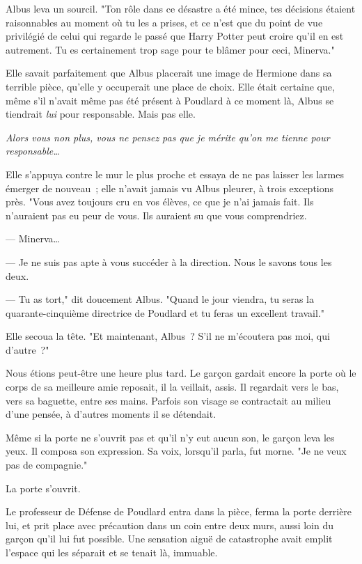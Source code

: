 Albus leva un sourcil. "Ton rôle dans ce désastre a été mince, tes décisions étaient raisonnables au moment où tu les a prises, et ce n'est que du point de vue privilégié de celui qui regarde le passé que Harry Potter peut croire qu'il en est autrement. Tu es certainement trop sage pour te blâmer pour ceci, Minerva."

Elle savait parfaitement que Albus placerait une image de Hermione dans sa terrible pièce, qu'elle y occuperait une place de choix. Elle était certaine que, même s'il n'avait même pas été présent à Poudlard à ce moment là, Albus se tiendrait \emph{lui} pour responsable. Mais pas elle.

\emph{Alors vous non plus, vous ne pensez pas que je mérite qu'on me tienne pour responsable…}

Elle s'appuya contre le mur le plus proche et essaya de ne pas laisser les larmes émerger de nouveau~; elle n'avait jamais vu Albus pleurer, à trois exceptions près. "Vous avez toujours cru en vos élèves, ce que je n'ai jamais fait. Ils n'auraient pas eu peur de vous. Ils auraient su que vous comprendriez.

--- Minerva…

--- Je ne suis pas apte à vous succéder à la direction. Nous le savons tous les deux.

--- Tu as tort," dit doucement Albus. "Quand le jour viendra, tu seras la quarante-cinquième directrice de Poudlard et tu feras un excellent travail."

Elle secoua la tête. "Et maintenant, Albus~? S'il ne m'écoutera pas moi, qui d'autre~?"

\later

Nous étions peut-être une heure plus tard. Le garçon gardait encore la porte où le corps de sa meilleure amie reposait, il la veillait, assis. Il regardait vers le bas, vers sa baguette, entre ses mains. Parfois son visage se contractait au milieu d'une pensée, à d'autres moments il se détendait.

Même si la porte ne s'ouvrit pas et qu'il n'y eut aucun son, le garçon leva les yeux. Il composa son expression. Sa voix, lorsqu'il parla, fut morne. "Je ne veux pas de compagnie."

La porte s'ouvrit.

Le professeur de Défense de Poudlard entra dans la pièce, ferma la porte derrière lui, et prit place avec précaution dans un coin entre deux murs, aussi loin du garçon qu'il lui fut possible. Une sensation aiguë de catastrophe avait emplit l'espace qui les séparait et se tenait là, immuable.

